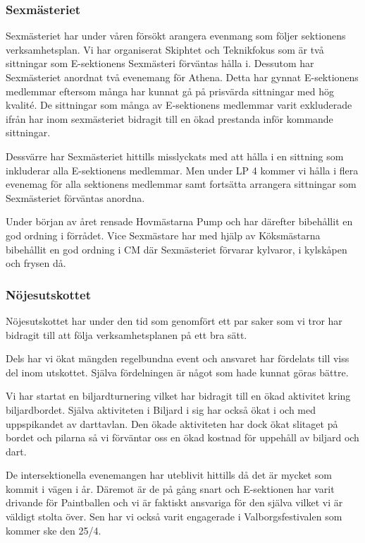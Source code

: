 \documentclass[../_main/handlingar.tex]{subfiles}
\begin{document}
\subsubsection*{Sexmästeriet}
Sexmästeriet har under våren  försökt arangera evenmang som följer sektionens verksamhetsplan. Vi har organiserat Skiphtet och Teknikfokus som är två sittningar som E-sektionens Sexmästeri förväntas hålla i. Dessutom har Sexmästeriet anordnat två evenemang för Athena. Detta har gynnat E-sektionens medlemmar eftersom många har kunnat gå på prisvärda sittningar med hög kvalité. De sittningar som många av E-sektionens medlemmar varit exkluderade ifrån har inom sexmästeriet bidragit till en ökad prestanda inför kommande sittningar. 

Dessvärre har Sexmästeriet hittills misslyckats med att hålla i en sittning som inkluderar alla E-sektionens medlemmar. Men under LP 4 kommer vi hålla i flera evenemag för alla sektionens medlemmar samt fortsätta arrangera sittningar som Sexmästeriet förväntas anordna.

Under början av året rensade Hovmästarna Pump och har därefter bibehållit en god ordning i förrådet. Vice Sexmästare har med hjälp av Köksmästarna bibehållit en god ordning i CM där Sexmästeriet förvarar kylvaror, i kylskåpen och frysen då.

\subsubsection*{Nöjesutskottet}
Nöjesutskottet har under den tid som genomfört ett par saker som vi tror har bidragit till att följa verksamhetsplanen på ett bra sätt.
\begin{dashlist}
    \item Dels har vi ökat mängden regelbundna event och ansvaret har fördelats till viss del inom utskottet. Själva fördelningen är något som hade kunnat göras bättre.
    \item Vi har startat en biljardturnering vilket har bidragit till en ökad aktivitet kring biljardbordet. Själva aktiviteten i Biljard i sig har också ökat i och med uppspikandet av darttavlan. Den ökade aktiviteten har dock ökat slitaget på bordet och pilarna så vi förväntar oss en ökad kostnad för uppehåll av biljard och dart.
    \item De intersektionella evenemangen har uteblivit hittills då det är mycket som kommit i vägen i år. Däremot är de på gång snart och E-sektionen har varit drivande för Paintballen och vi är faktiskt ansvariga för den själva vilket vi är väldigt stolta över. Sen har vi också varit engagerade i Valborgsfestivalen som kommer ske den 25/4. 
\end{dashlist}
\end{document}
